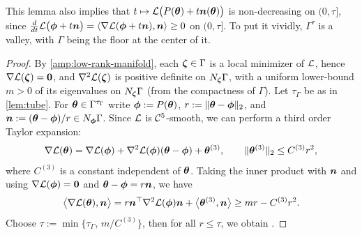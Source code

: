 \begin{remark}
    This lemma also implies that $t\mapsto \mathcal{L}\big(P({\bm{\theta}})+t{\bm{n}}({\bm{\theta}})\big)$ is non-decreasing on $(0,\tau]$, since $\frac{d}{dt}\mathcal{L}\big({\bm{\phi}}+t{\bm{n}}\big)=\langle \nabla\mathcal{L}({\bm{\phi}}+t{\bm{n}}),{\bm{n}}\rangle \ge 0$ on $(0,\tau]$. To put it vividly, $\Gamma^{\tau}$ is a valley, with $\Gamma$ being the floor at the center of it.
\end{remark}
\begin{proof}
By \cref{amp:low-rank-manifold}, each ${\bm{\zeta}}\in\Gamma$ is a local minimizer of $\mathcal{L}$, hence $\nabla\mathcal{L}({\bm{\zeta}})={\bm{0}}$,
and $\nabla^2\mathcal{L}({\bm{\zeta}})$ is positive definite on $N_{{\bm{\zeta}}}\Gamma$, with a uniform lower-bound
$m>0$ of its eigenvalues on $N_{{\bm{\zeta}}}\Gamma$ (from the compactness of $\Gamma$). Let $\tau_{\Gamma}$ be as in \cref{lem:tube}. 
For ${\bm{\theta}}\in \Gamma^{\tau_{\Gamma}}$ write ${\bm{\phi}}:=P({\bm{\theta}})$, $r:=\|{\bm{\theta}}-{\bm{\phi}}\|_2$,
and ${\bm{n}}:=({\bm{\theta}}-{\bm{\phi}})/r\in N_{{\bm{\phi}}}\Gamma$. Since $\mathcal{L}$ is $\mathcal{C}^5$-smooth, we can perform a third order Taylor expansion:
\begin{align*}
\nabla\mathcal{L}({\bm{\theta}})
= \nabla\mathcal{L}({\bm{\phi}}) + \nabla^2\mathcal{L}({\bm{\phi}})({\bm{\theta}}-{\bm{\phi}}) + {\bm{\theta}}^{(3)},
\qquad \|{\bm{\theta}}^{(3)}\|_2 \leq C^{(3)} r^2,
\end{align*}
where $C^{(3)}$ is a constant independent of ${\bm{\theta}}$.
Taking the inner product with ${\bm{n}}$ and using $\nabla\mathcal{L}({\bm{\phi}})={\bm{0}}$ and ${\bm{\theta}}-{\bm{\phi}}= r{\bm{n}}$, we have
\begin{align*}
\big\langle \nabla\mathcal{L}({\bm{\theta}}), {\bm{n}}\big\rangle
= r{\bm{n}}^\top\nabla^2\mathcal{L}({\bm{\phi}}){\bm{n}} + \big\langle {\bm{\theta}}^{(3)},{\bm{n}}\big\rangle
\geq m r - C^{(3)} r^2 .
\end{align*}
Choose $\tau:=\min\{\tau_{\Gamma},\, m/C^{(3)}\}$, 
then for all $r\le\tau$, we obtain .
\end{proof}

